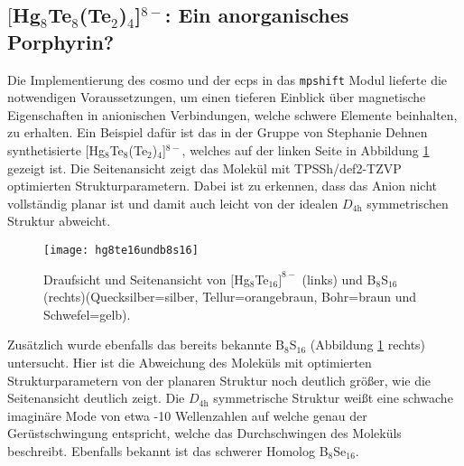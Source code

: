 \subsection{\texorpdfstring{$[$Hg$_8$Te$_8$(Te$_2$)$_4$]$^{8-}$}{[Hg\_8Te\_8(Te\_2)\_4]\^8-}: Ein anorganisches Porphyrin?}
Die Implementierung des \ac{cosmo} und der \acp{ecp} in das \texttt{mpshift} Modul lieferte die notwendigen Voraussetzungen, um einen tieferen Einblick über magnetische Eigenschaften in anionischen Verbindungen, welche schwere Elemente beinhalten, zu erhalten. Ein Beispiel dafür ist das in der Gruppe von Stephanie Dehnen synthetisierte $[$Hg$_8$Te$_8$(Te$_2$)$_4$]$^{8-}$\supercite{dehnenhg4te8}, welches auf der linken Seite in Abbildung \ref{abb:hg8te16undb8s16} gezeigt ist. Die Seitenansicht  zeigt das Molekül mit TPSSh\supercite{tao2003climbing}/def2-TZVP\supercite{weigend2005balanced} optimierten Strukturparametern. Dabei ist zu erkennen, dass das Anion nicht vollständig planar ist und damit auch leicht von der idealen $D_{4\textrm{h}}$ symmetrischen Struktur abweicht. 
\begin{figure}[ht!]
	\centering
	\texttt{[image: hg8te16undb8s16]}
	\captionsetup{figurewithin = chapter}
	\captionsetup{font=small, labelfont=bf}\caption[{Abbildung von $[$Hg$_8$Te$_{16}]^{8-}$ und B$_8$S$_{16}$}]{{Draufsicht und Seitenansicht von $[$Hg$_8$Te$_{16}]^{8-}$} (links) und B$_8$S$_{16}$ (rechts)(Quecksilber=silber, Tellur=orangebraun, Bohr=braun und Schwefel=gelb).}
\label{abb:hg8te16undb8s16}
\end{figure}

Zusätzlich wurde ebenfalls das bereits bekannte B$_8$S$_{16}$\supercite{krebs1980b8s16} (Abbildung \ref{abb:hg8te16undb8s16} rechts) untersucht. Hier ist die Abweichung des Moleküls mit optimierten Strukturparametern von der planaren Struktur noch deutlich größer, wie die Seitenansicht deutlich zeigt. Die $D_{4\textrm{h}}$ symmetrische Struktur weißt eine schwache imaginäre Mode von etwa -10 Wellenzahlen auf welche genau der Gerüstschwingung entspricht, welche das Durchschwingen des Moleküls beschreibt. Ebenfalls bekannt ist das schwerer Homolog B$_8$Se$_{16}$.

